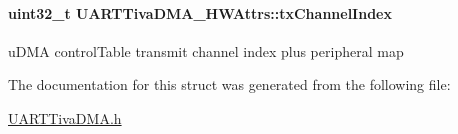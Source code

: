 \paragraph[{tx\+Channel\+Index}]{\setlength{\rightskip}{0pt plus 5cm}uint32\+\_\+t U\+A\+R\+T\+Tiva\+D\+M\+A\+\_\+\+H\+W\+Attrs\+::tx\+Channel\+Index}\label{struct_u_a_r_t_tiva_d_m_a___h_w_attrs_af4475ebe44ae2d17d0967c00266c586c}
u\+D\+M\+A control\+Table transmit channel index plus peripheral map 

The documentation for this struct was generated from the following file\+:\begin{DoxyCompactItemize}
\item 
\hyperlink{_u_a_r_t_tiva_d_m_a_8h}{U\+A\+R\+T\+Tiva\+D\+M\+A.\+h}\end{DoxyCompactItemize}
